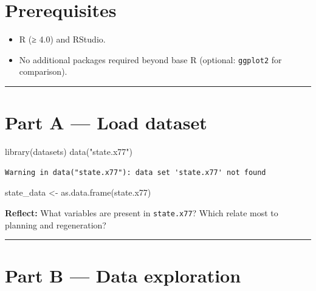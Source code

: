 \documentclass[
  letterpaper,
  DIV=11,
  numbers=noendperiod]{scrreprt}
\newenvironment{Shaded}{\begin{snugshade}}{\end{snugshade}}
\newcommand{\FunctionTok}[1]{\textcolor[rgb]{0.28,0.35,0.67}{#1}}
\newcommand{\NormalTok}[1]{\textcolor[rgb]{0.00,0.23,0.31}{#1}}
\newcommand{\OtherTok}[1]{\textcolor[rgb]{0.00,0.23,0.31}{#1}}
\newcommand{\StringTok}[1]{\textcolor[rgb]{0.13,0.47,0.30}{#1}}
\providecommand{\tightlist}{%
  \setlength{\itemsep}{0pt}\setlength{\parskip}{0pt}}
\begin{document}
\section{Prerequisites}\label{prerequisites-3}

\begin{itemize}
\tightlist
\item
  R (≥ 4.0) and RStudio.
\item
  No additional packages required beyond base R (optional:
  \texttt{ggplot2} for comparison).
\end{itemize}

\begin{center}\rule{0.5\linewidth}{0.5pt}\end{center}

\section{Part A --- Load dataset}\label{part-a-load-dataset}

\begin{Shaded}
\begin{Highlighting}[]
\FunctionTok{library}\NormalTok{(datasets)}
\FunctionTok{data}\NormalTok{(}\StringTok{"state.x77"}\NormalTok{)}
\end{Highlighting}
\end{Shaded}

\begin{verbatim}
Warning in data("state.x77"): data set 'state.x77' not found
\end{verbatim}

\begin{Shaded}
\begin{Highlighting}[]
\NormalTok{state\_data }\OtherTok{\textless{}{-}} \FunctionTok{as.data.frame}\NormalTok{(state.x77)}
\end{Highlighting}
\end{Shaded}

\textbf{Reflect:} What variables are present in \texttt{state.x77}?
Which relate most to planning and regeneration?

\begin{center}\rule{0.5\linewidth}{0.5pt}\end{center}

\section{Part B --- Data exploration}\label{part-b-data-exploration}
\end{document}
